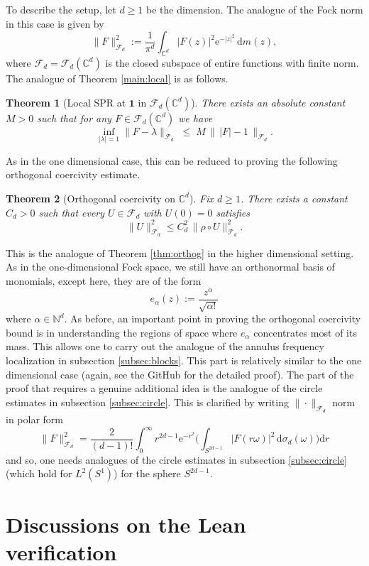 \documentclass[11pt]{amsart}
\newtheorem{theorem}{Theorem}[section]
\theoremstyle{remark}
\newcommand{\C}{\mathbb{C}}
\newcommand{\abs}[1]{\lvert #1 \rvert}
\newcommand{\norm}[1]{\lVert #1 \rVert}
\newcommand{\dd}{\mathrm{d}}
\newcommand{\ee}{\mathrm{e}}
\newcommand{\rhoFn}{\rho}
\newcommand{\Fd}{\mathcal{F}_d}
\newcommand{\Sphere}{S^{2d-1}}
\begin{document}
To describe the setup, let $d\geq 1$ be the dimension. The analogue of the Fock norm in this case is given by
\[
\norm{F}_{\Fd}^2
:=
\frac{1}{\pi^d}\int_{\C^d} \abs{F(z)}^2 \ee^{-\abs{z}^2}\,\dd m(z),
\]
where $\Fd = \Fd(\C^d)$ is the closed subspace of entire functions with
finite norm. The analogue of Theorem \ref{main:local} is as follows.
\begin{theorem}[Local SPR at $\mathbf{1}$ in $\mathcal{F}_d(\mathbb{C}^d)$]\label{mainhigherd:local}
There exists an absolute constant $M> 0$ such
that for any $F\in \mathcal{F}_d(\mathbb{C}^d)$ we have
\[
\inf_{|\lambda|=1}\lVert F - \lambda \rVert_{\mathcal{F}_d}
\;\le\;
M\,
\bigl\|\, \lvert F \rvert - 1 \,\bigr\|_{\mathcal{F}_d}.
\]
\end{theorem}
As in the one dimensional case, this can be reduced to proving the following orthogonal coercivity estimate.
\begin{theorem}[Orthogonal coercivity on $\C^d$]\label{thm:orthogd}
Fix $d \ge 1$.  There exists a constant $C_d > 0$ such that every
$U \in \Fd$ with $U(0) = 0$ satisfies
\[
\norm{U}_{\Fd}^2
\le
C_d^2\, \norm{\rhoFn \circ U}_{\Fd}^2.
\]
\end{theorem}
This is the analogue of Theorem \ref{thm:orthog} in the higher dimensional setting. As in the one-dimensional Fock space, we still have an orthonormal basis of monomials, except here, they are of the form
\[
e_\alpha(z) := \frac{z^\alpha}{\sqrt{\alpha!}}
\]
where $\alpha\in\mathbb{N}^d$. As before, an important point in proving the orthogonal coercivity bound is in understanding the regions of space where $e_{\alpha}$ concentrates most of its mass. This allows one to carry out the analogue of the annulus frequency localization in subsection \ref{subsec:blocks}. This part is relatively similar to the one dimensional case (again, see the GitHub for the detailed proof). The part of the proof that requires a genuine additional idea is the analogue of the circle estimates in subsection \ref{subsec:circle}. This is clarified by writing $\|\cdot\|_{\mathcal{F}_d}$ norm in polar form
\begin{equation}\label{eq:polard}
\norm{F}_{\Fd}^2
=
\frac{2}{(d-1)!}
\int_0^\infty
r^{2d-1} \ee^{-r^2}
\biggl(
\int_{\Sphere} \abs{F(r\omega)}^2\,\dd \sigma_d(\omega)
\biggr)\dd r
\end{equation}
and so, one needs analogues of the circle estimates in subsection \ref{subsec:circle} (which hold for $L^2(S^1)$) for the sphere $S^{2d-1}$.

\section{Discussions on the Lean verification}\label{App}
\end{document}
